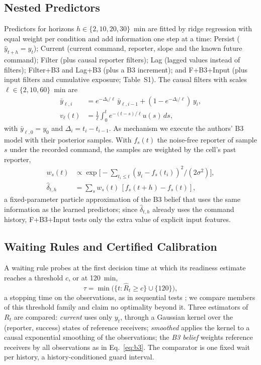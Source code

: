 \documentclass[conference]{IEEEtran}
\newcommand{\pr}[1]{\textsf{#1}}
\begin{document}
\subsection{Nested Predictors}
\label{sec:predictors}
Predictors for horizons $h\in\{2,10,20,30\}$~min are fitted by ridge regression with equal weight per condition and add information one step at a time: \pr{Persist} ($\hat y_{t+h}=y_t$); \pr{Current} (current command, reporter, slope and the known future command); \pr{Filter} (plus causal reporter filters); \pr{Lag} (lagged values instead of filters); \pr{Filter+B3} and \pr{Lag+B3} (plus a B3 increment); and \pr{F+B3+Input} (plus input filters and cumulative exposure; Table~S1). The causal filters with scales $\ell\in\{2,10,60\}$~min are
\begin{equation}
 \begin{aligned}
 \bar y_{\ell,i}&=e^{-\Delta_i/\ell}\,\bar y_{\ell,i-1}+(1-e^{-\Delta_i/\ell})\,y_i,\\
 v_{\ell}(t)&=\tfrac{1}{\ell}\textstyle\int_0^t e^{-(t-s)/\ell}u(s)\,ds,
 \end{aligned}
 \label{eq:filters}
\end{equation}
with $\bar y_{\ell,0}=y_0$ and $\Delta_i=t_i-t_{i-1}$. As mechanism we execute the authors' B3 model with their posterior samples. With $f_s(t)$ the noise-free reporter of sample $s$ under the recorded command, the samples are weighted by the cell's past reporter,
\begin{equation}
 \begin{aligned}
 w_s(t)&\propto\textstyle\exp\big[-\sum_{t_i\le t}(y_i-f_s(t_i))^2/(2\sigma^2)\big],\\
 \hat\delta_{t,h}&=\textstyle\sum_s w_s(t)\,[f_s(t+h)-f_s(t)],
 \end{aligned}
 \label{eq:b3}
\end{equation}
a fixed-parameter particle approximation of the B3 belief that uses the same information as the learned predictors; since $\hat\delta_{t,h}$ already uses the command history, \pr{F+B3+Input} tests only the extra value of explicit input features.

\subsection{Waiting Rules and Certified Calibration}
\label{sec:rules}
A waiting rule probes at the first decision time at which its readiness estimate reaches a threshold $c$, or at 120~min,
\begin{equation}
 \tau=\min\big(\{t:\widehat R_{t}\geq c\}\cup\{120\}\big),
 \label{eq:wait}
\end{equation}
a stopping time on the observations, as in sequential tests \cite{wald1945}; we compare members of this threshold family and claim no optimality beyond it. Three estimators of $R_t$ are compared: \emph{current} uses only $y_t$, through a Gaussian kernel over the (reporter, success) states of reference receivers; \emph{smoothed} applies the kernel to a causal exponential smoothing of the observations; the \emph{B3 belief} weights reference receivers by all observations as in Eq.~\eqref{eq:b3}. The comparator is one fixed wait per history, a history-conditioned guard interval.
\end{document}

